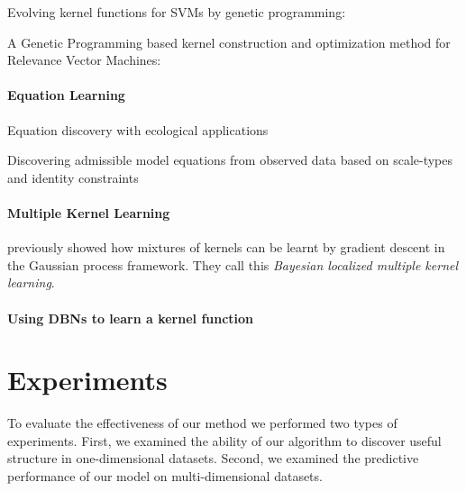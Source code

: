 \documentclass[twoside]{article}
\begin{document}
Evolving kernel functions for SVMs by genetic programming: \cite{diosan2007evolving}

A Genetic Programming based kernel construction and optimization method for Relevance Vector Machines: \cite{bing2010gp}

\paragraph{Equation Learning}

Equation discovery with ecological applications \cite{dzeroski1999equation}

Discovering admissible model equations from observed data based on scale-types and identity constraints \cite{washio1999discovering}

\paragraph{Multiple Kernel Learning}

\cite{christoudias2009bayesian} previously showed how mixtures of kernels can be learnt by gradient descent in the Gaussian process framework.
They call this \emph{Bayesian localized multiple kernel learning}.

\paragraph{Using DBNs to learn a kernel function}


\section{Experiments}

To evaluate the effectiveness of our method we performed two types of experiments.
First, we examined the ability of our algorithm to discover useful structure in one-dimensional datasets.  Second, we examined the predictive performance of our model on multi-dimensional datasets.
\end{document}
